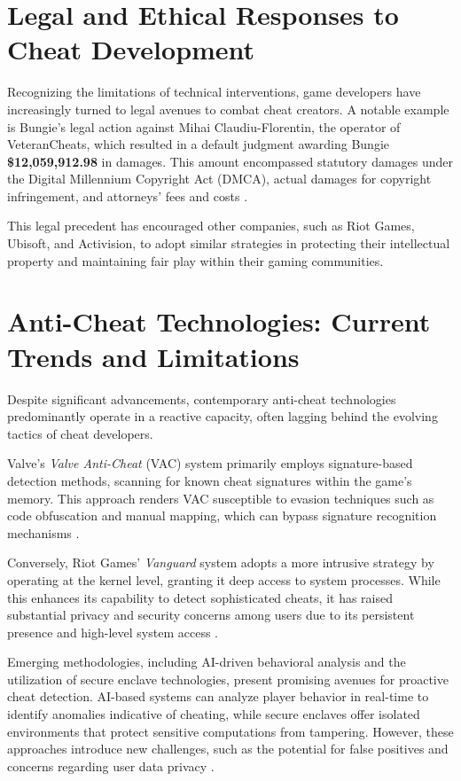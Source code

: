 \section{Legal and Ethical Responses to Cheat Development}

Recognizing the limitations of technical interventions, game developers have increasingly turned to legal avenues to combat cheat creators. A notable example is Bungie's legal action against Mihai Claudiu-Florentin, the operator of VeteranCheats, which resulted in a default judgment awarding Bungie \textbf{\$12,059,912.98} in damages. This amount encompassed statutory damages under the Digital Millennium Copyright Act (DMCA), actual damages for copyright infringement, and attorneys' fees and costs \parencite{torrentfreak2023bungie}.

This legal precedent has encouraged other companies, such as Riot Games, Ubisoft, and Activision, to adopt similar strategies in protecting their intellectual property and maintaining fair play within their gaming communities.

\newpage
\section{Anti-Cheat Technologies: Current Trends and Limitations}

Despite significant advancements, contemporary anti-cheat technologies predominantly operate in a reactive capacity, often lagging behind the evolving tactics of cheat developers.

Valve's \textit{Valve Anti-Cheat} (VAC) system primarily employs signature-based detection methods, scanning for known cheat signatures within the game's memory. This approach renders VAC susceptible to evasion techniques such as code obfuscation and manual mapping, which can bypass signature recognition mechanisms \parencite{turn0search0}.

Conversely, Riot Games' \textit{Vanguard} system adopts a more intrusive strategy by operating at the kernel level, granting it deep access to system processes. While this enhances its capability to detect sophisticated cheats, it has raised substantial privacy and security concerns among users due to its persistent presence and high-level system access \parencite{turn0search1}.

Emerging methodologies, including AI-driven behavioral analysis and the utilization of secure enclave technologies, present promising avenues for proactive cheat detection. AI-based systems can analyze player behavior in real-time to identify anomalies indicative of cheating, while secure enclaves offer isolated environments that protect sensitive computations from tampering. However, these approaches introduce new challenges, such as the potential for false positives and concerns regarding user data privacy \parencite{turn0search5, turn0search2}.

